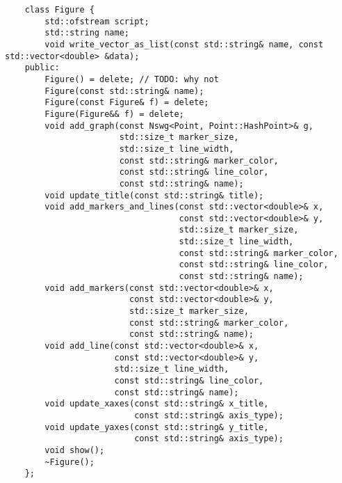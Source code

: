 \begin{verbatim}
    class Figure {
        std::ofstream script;
        std::string name;
        void write_vector_as_list(const std::string& name, const std::vector<double> &data);
    public:
        Figure() = delete; // TODO: why not
        Figure(const std::string& name);
        Figure(const Figure& f) = delete;
        Figure(Figure&& f) = delete;
        void add_graph(const Nswg<Point, Point::HashPoint>& g,
                       std::size_t marker_size,
                       std::size_t line_width,
                       const std::string& marker_color,
                       const std::string& line_color,
                       const std::string& name);
        void update_title(const std::string& title);
        void add_markers_and_lines(const std::vector<double>& x,
                                   const std::vector<double>& y,
                                   std::size_t marker_size,
                                   std::size_t line_width,
                                   const std::string& marker_color,
                                   const std::string& line_color,
                                   const std::string& name);
        void add_markers(const std::vector<double>& x,
                         const std::vector<double>& y,
                         std::size_t marker_size,
                         const std::string& marker_color,
                         const std::string& name);
        void add_line(const std::vector<double>& x,
                      const std::vector<double>& y,
                      std::size_t line_width,
                      const std::string& line_color,
                      const std::string& name);
        void update_xaxes(const std::string& x_title, 
                          const std::string& axis_type);
        void update_yaxes(const std::string& y_title, 
                          const std::string& axis_type);
        void show();
        ~Figure();
    };
\end{verbatim}




